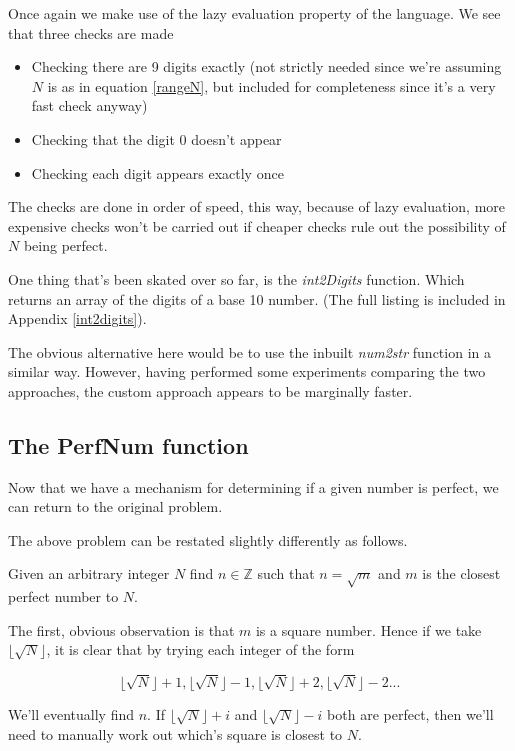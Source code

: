 \documentclass[10pt]{article}
\begin{document}
 Once again we make use of the lazy evaluation property of the language. We see that three checks are made
 
 \begin{itemize}
 \item Checking there are 9 digits exactly (not strictly needed since we're assuming $N$ is as in equation \ref{rangeN}, but included  for completeness since it's a very fast check anyway)
 \item Checking that the digit $0$ doesn't appear
 \item Checking each digit appears exactly once
 \end{itemize}
 
 The checks are done in order of speed, this way, because of lazy evaluation, more expensive checks won't be carried out if cheaper checks rule out the possibility of $N$ being perfect.
 
 One thing that's been skated over so far, is the \emph{int2Digits} function. Which returns an array of the digits of a base 10 number. (The full listing is included in Appendix \ref{int2digits}).
 
 The obvious alternative here would be to use the inbuilt \emph{num2str} function in a similar way. However, having performed some experiments comparing the two approaches, the custom approach appears to be marginally faster.
 
\subsection{The PerfNum function}

Now that we have a mechanism for determining if a given number is perfect, we can return to the original problem.

The above problem can be restated slightly differently as follows.

Given an arbitrary integer $N$ find $n \in \mathbb{Z}$ such that $n = \sqrt{m}$ and $m$ is the closest perfect number to $N$.

The first, obvious observation is that $m$ is a square number. Hence if we take $\lfloor\sqrt{N} \rfloor$, it is clear that by trying each integer of the form 

$$ \lfloor\sqrt{N} \rfloor + 1, \lfloor\sqrt{N} \rfloor - 1, \lfloor\sqrt{N} \rfloor + 2, \lfloor\sqrt{N} \rfloor -2 ...$$

We'll eventually find $n$. If $ \lfloor\sqrt{N} \rfloor + i  $ and  $ \lfloor\sqrt{N} \rfloor - i  $ both are perfect, then we'll need to manually work out which's square is closest to $N$.
\end{document}
